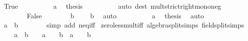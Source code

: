 \begin{isabellebody}
\ True\isanewline
\ \ \ \ \ \ \isamarkupfalse%
\ {\isacartoucheopen}{}\ {\isacharless}{\kern0pt}\ a{\isacartoucheclose}\ \isamarkupfalse%
\ {\isacharquery}{\kern0pt}thesis\isanewline
\ \ \ \ \ \ \ \ \isamarkupfalse%
\ {\isacharparenleft}{\kern0pt}auto\ dest{\isacharcolon}{\kern0pt}\ mult{\isacharunderscore}{\kern0pt}strict{\isacharunderscore}{\kern0pt}right{\isacharunderscore}{\kern0pt}mono{\isacharunderscore}{\kern0pt}neg{\isacharparenright}{\kern0pt}\isanewline
\ \ \ \ \isamarkupfalse%
\isanewline
\ \ \ \ \ \ \isamarkupfalse%
\ False\isanewline
\ \ \ \ \ \ \isamarkupfalse%
\ b\ \isamarkupfalse%
\ {\isachardoublequoteopen}{}\ {\isacharless}{\kern0pt}\ b{\isachardoublequoteclose}\ \isamarkupfalse%
\ auto\isanewline
\ \ \ \ \ \ \isamarkupfalse%
\ {\isacartoucheopen}{}\ {\isacharless}{\kern0pt}\ a{\isacartoucheclose}\ \isamarkupfalse%
\ {\isacharquery}{\kern0pt}thesis\ \isamarkupfalse%
\ auto\isanewline
\ \ \ \ \isamarkupfalse%
\isanewline
\ \ \isamarkupfalse%
\isanewline
\ \ \isamarkupfalse%
\ \isamarkupfalse%
\ {\isachardoublequoteopen}a\ {\isacharasterisk}{\kern0pt}\ b\ {\isasymnoteq}\ {}{\isachardoublequoteclose}\isanewline
\ \ \ \ \isamarkupfalse%
\ {\isacharparenleft}{\kern0pt}simp\ add{\isacharcolon}{\kern0pt}\ neq{\isacharunderscore}{\kern0pt}iff{\isacharparenright}{\kern0pt}\isanewline
{}\isamarkupfalse%
%
\endisatagproof
{\isafoldproof}%
%
\isadelimproof
\isanewline
%
\endisadelimproof
\isanewline
{}\isamarkupfalse%
\ zero{\isacharunderscore}{\kern0pt}less{\isacharunderscore}{\kern0pt}mult{\isacharunderscore}{\kern0pt}iff\ {\isacharbrackleft}{\kern0pt}algebra{\isacharunderscore}{\kern0pt}split{\isacharunderscore}{\kern0pt}simps{\isacharcomma}{\kern0pt}\ field{\isacharunderscore}{\kern0pt}split{\isacharunderscore}{\kern0pt}simps{\isacharbrackright}{\kern0pt}{\isacharcolon}{\kern0pt}\isanewline
\ \ {\isachardoublequoteopen}{}\ {\isacharless}{\kern0pt}\ a\ {\isacharasterisk}{\kern0pt}\ b\ {\isasymlongleftrightarrow}\ {}\ {\isacharless}{\kern0pt}\ a\ {\isasymand}\ {}\ {\isacharless}{\kern0pt}\ b\ {\isasymor}\ a\ {\isacharless}{\kern0pt}\ {}\ {\isasymand}\ b\ {\isacharless}{\kern0pt}\ {}{\isachardoublequoteclose}\isanewline
%
\isadelimproof
\ \ %
\endisadelimproof

\end{isabellebody}

